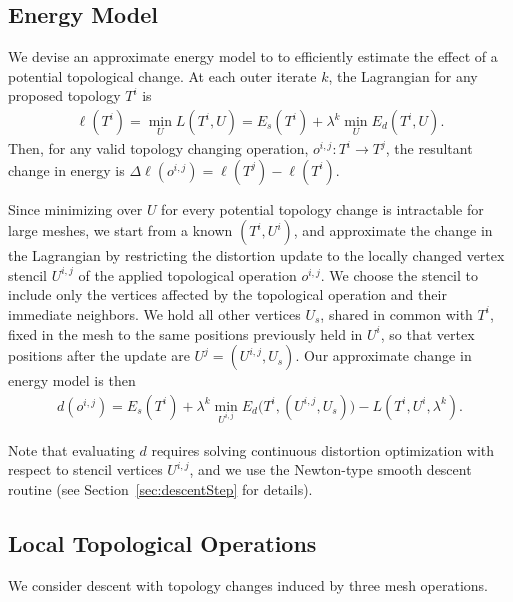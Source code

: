 \subsection{Energy Model}
\label{sec:topology_energy}
We devise an approximate energy model to to efficiently estimate the effect of a potential topological change. 
At each outer iterate $k$, the Lagrangian for any proposed topology $T^i$ is  
\begin{align}
\ell(T^i) = \min_{U} L(T^i, U) = E_s(T^i) + \lambda^k \min_{U} E_d(T^i, U).
\end{align}
Then, for any valid topology changing operation, $o^{i,j}:T^i \rightarrow T^j$, the resultant change in energy is $\Delta \ell(o^{i,j}) = \ell(T^j) - \ell(T^i)$.

Since minimizing over $U$ for every potential topology change is intractable for large meshes, we start from a known $(T^i, U^i)$, and approximate the change in the Lagrangian by restricting the distortion update to the locally changed vertex stencil $U^{i,j}$ of the applied topological operation $o^{i,j}$. We choose the stencil to include only the vertices affected by the topological operation and their immediate neighbors.
We hold all other vertices $U_s$, shared in common with $T^i$, fixed in the mesh
to the same positions previously held in $U^i$, so that vertex positions after the update are $U^j = (U^{i,j}, U_s)$.  Our approximate change in energy model is then 
\begin{align} 
d(o^{i,j}) = E_s(T^i) + \lambda^k \min_{U^{i,j}} E_d \big( T^i, (U^{i,j}, U_s) \big) - L(T^i,U^i,\lambda^k).
\end{align}

Note that evaluating $d$ requires solving continuous distortion optimization with respect to stencil vertices $U^{i,j}$, and we use the Newton-type smooth descent routine (see Section~\ref{sec:descentStep} for details).

\subsection{Local Topological Operations}
\label{sec:topology_ops}

We consider descent with topology changes induced by three mesh operations.

